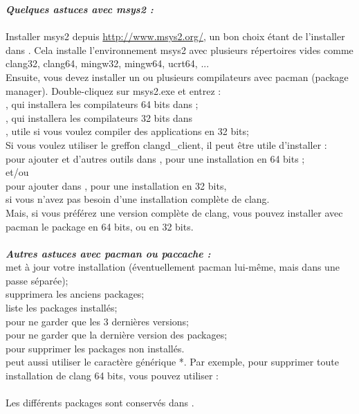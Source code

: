 \textbf{\textit{Quelques astuces avec msys2 : }}\\
\\
Installer msys2 depuis \url{http://www.msys2.org/}, un bon choix étant de l'installer dans . Cela installe l'environnement msys2 avec plusieurs répertoires vides comme clang32, clang64, mingw32, mingw64, ucrt64, ...\\
Ensuite, vous devez installer un ou plusieurs compilateurs avec pacman (package manager). Double-cliquez sur msys2.exe et entrez :\\
, qui installera les compilateurs 64 bits dans  ; \\
, qui installera les compilateurs 32 bits dans \\
, utile si vous voulez compiler des applications en 32 bits;\\
Si vous voulez utiliser le greffon clangd\_client, il peut être utile d'installer :\\
 pour ajouter  et d'autres outils dans , pour une installation en 64 bits ;\\
et/ou \\
 pour ajouter  dans , pour une installation en 32 bits,\\
si vous n'avez pas besoin d'une installation complète de clang.\\
Mais, si vous préférez une version complète de clang, vous pouvez installer avec pacman le package  en 64 bits, ou  en 32 bits.\\
\\
\textbf{\textit{Autres astuces avec pacman ou paccache :}}\\
 met à jour votre installation (éventuellement pacman lui-même, mais dans une passe séparée);\\
 supprimera les anciens packages;\\
 liste les packages installés;\\
 pour ne garder que les 3 dernières versions;\\
 pour ne garder que la dernière version des packages;\\
 pour supprimer les packages non installés.\\
 peut aussi utiliser le caractère générique *. Par exemple, pour supprimer toute installation de clang 64 bits, vous pouvez utiliser :\\
\\
Les différents packages sont conservés dans .


